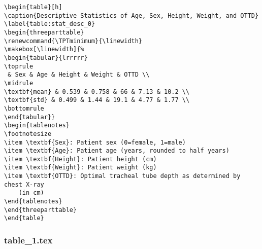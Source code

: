 \documentclass[11pt]{article}
\begin{document}
\begin{Verbatim}[tabsize=4]
\begin{table}[h]
\caption{Descriptive Statistics of Age, Sex, Height, Weight, and OTTD}
\label{table:stat_desc_0}
\begin{threeparttable}
\renewcommand{\TPTminimum}{\linewidth}
\makebox[\linewidth]{%
\begin{tabular}{lrrrrr}
\toprule
 & Sex & Age & Height & Weight & OTTD \\
\midrule
\textbf{mean} & 0.539 & 0.758 & 66 & 7.13 & 10.2 \\
\textbf{std} & 0.499 & 1.44 & 19.1 & 4.77 & 1.77 \\
\bottomrule
\end{tabular}}
\begin{tablenotes}
\footnotesize
\item \textbf{Sex}: Patient sex (0=female, 1=male)
\item \textbf{Age}: Patient age (years, rounded to half years)
\item \textbf{Height}: Patient height (cm)
\item \textbf{Weight}: Patient weight (kg)
\item \textbf{OTTD}: Optimal tracheal tube depth as determined by chest X-ray
	(in cm)
\end{tablenotes}
\end{threeparttable}
\end{table}

\end{Verbatim}

\subsubsection*{table\_1.tex}
\end{document}
